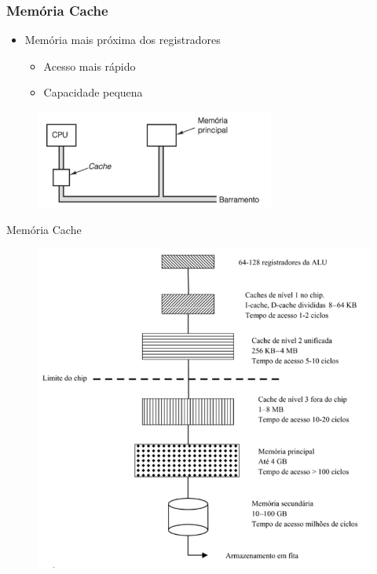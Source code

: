 \documentclass[aspectratio=169,
				xcolor=table]{beamer}
\begin{document}
	\begin{frame}
		\frametitle{Memória Cache}
		\begin{itemize}
			\item Memória mais próxima dos registradores
			\begin{itemize}
				\item Acesso mais rápido
				\item Capacidade pequena
			\end{itemize}
		\end{itemize}
		\begin{figure}[hbtp]
			\centering
			\includegraphics[width=0.7\textwidth, keepaspectratio]{../figs/cap06/cache.png}
		\end{figure}		
	\end{frame}

	\begin{frame}{Memória Cache}

		\begin{figure}[hbtp]
			\centering
			\includegraphics[height=0.8\textheight, keepaspectratio]{../figs/cap07/hierarquia.png}
		\end{figure}		
	\end{frame}
	
\end{document}
